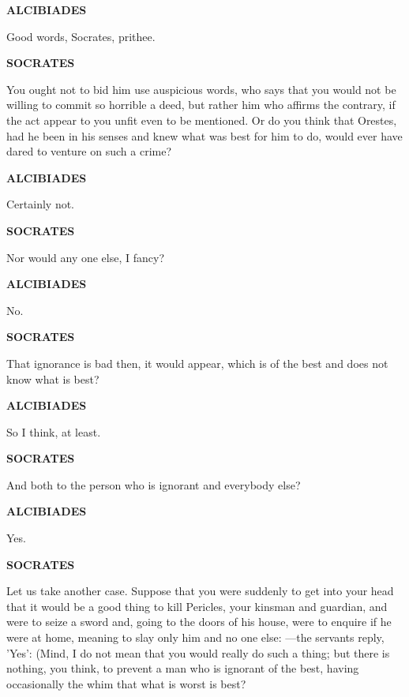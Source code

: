 \documentclass[11pt,letter]{article}
\begin{document}
\par \textbf{ALCIBIADES}
\par   Good words, Socrates, prithee.

\par \textbf{SOCRATES}
\par   You ought not to bid him use auspicious words, who says that you would not be willing to commit so horrible a deed, but rather him who affirms the contrary, if the act appear to you unfit even to be mentioned. Or do you think that Orestes, had he been in his senses and knew what was best for him to do, would ever have dared to venture on such a crime?

\par \textbf{ALCIBIADES}
\par   Certainly not.

\par \textbf{SOCRATES}
\par   Nor would any one else, I fancy?

\par \textbf{ALCIBIADES}
\par   No.

\par \textbf{SOCRATES}
\par   That ignorance is bad then, it would appear, which is of the best and does not know what is best?

\par \textbf{ALCIBIADES}
\par   So I think, at least.

\par \textbf{SOCRATES}
\par   And both to the person who is ignorant and everybody else?

\par \textbf{ALCIBIADES}
\par   Yes.

\par \textbf{SOCRATES}
\par   Let us take another case. Suppose that you were suddenly to get into your head that it would be a good thing to kill Pericles, your kinsman and guardian, and were to seize a sword and, going to the doors of his house, were to enquire if he were at home, meaning to slay only him and no one else: —the servants reply, 'Yes':  (Mind, I do not mean that you would really do such a thing; but there is nothing, you think, to prevent a man who is ignorant of the best, having occasionally the whim that what is worst is best?
\end{document}
